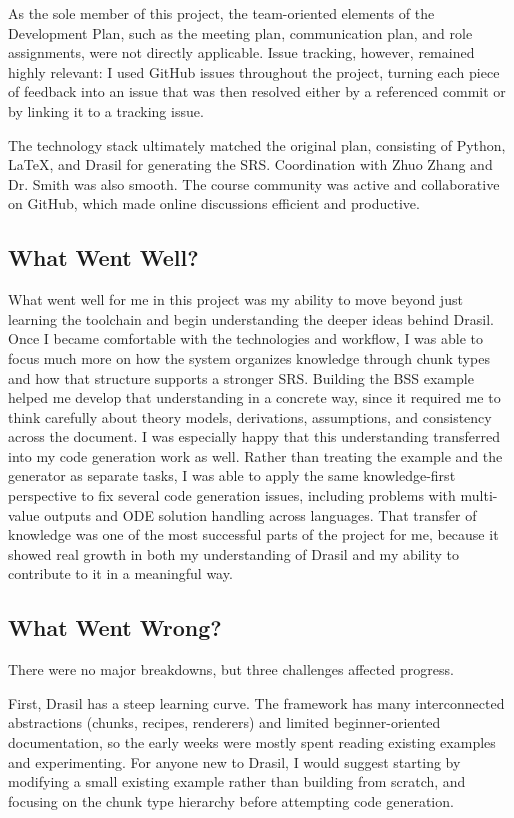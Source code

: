 \documentclass{article}
\begin{document}
As the sole member of this project, the team-oriented elements of the Development Plan,
such as the meeting plan, communication plan, and role assignments, were not directly
applicable. Issue tracking, however, remained highly relevant: I used GitHub issues
throughout the project, turning each piece of feedback into an issue that was then
resolved either by a referenced commit or by linking it to a tracking issue.

The technology stack ultimately matched the original plan, consisting of Python, LaTeX,
and Drasil for generating the SRS. Coordination with Zhuo Zhang and Dr. Smith was also
smooth. The course community was active and collaborative on GitHub, which made online
discussions efficient and productive.

\subsection{What Went Well?}

What went well for me in this project was my ability to move beyond just learning the toolchain and
begin understanding the deeper ideas behind Drasil. Once I became comfortable with the technologies
and workflow, I was able to focus much more on how the system organizes knowledge through chunk
types and how that structure supports a stronger SRS. Building the BSS example helped me develop
that understanding in a concrete way, since it required me to think carefully about theory models,
derivations, assumptions, and consistency across the document. I was especially happy that this
understanding transferred into my code generation work as well. Rather than treating the example and
the generator as separate tasks, I was able to apply the same knowledge-first perspective to fix
several code generation issues, including problems with multi-value outputs and ODE solution
handling across languages. That transfer of knowledge was one of the most successful parts of the
project for me, because it showed real growth in both my understanding of Drasil and my ability to
contribute to it in a meaningful way.

\subsection{What Went Wrong?}

There were no major breakdowns, but three challenges affected progress.

First, Drasil has a steep learning curve. The framework has many
interconnected abstractions (chunks, recipes, renderers) and limited
beginner-oriented documentation, so the early weeks were mostly spent
reading existing examples and experimenting. For anyone new to Drasil,
I would suggest starting by modifying a small existing example rather
than building from scratch, and focusing on the chunk type hierarchy
before attempting code generation.
\end{document}

